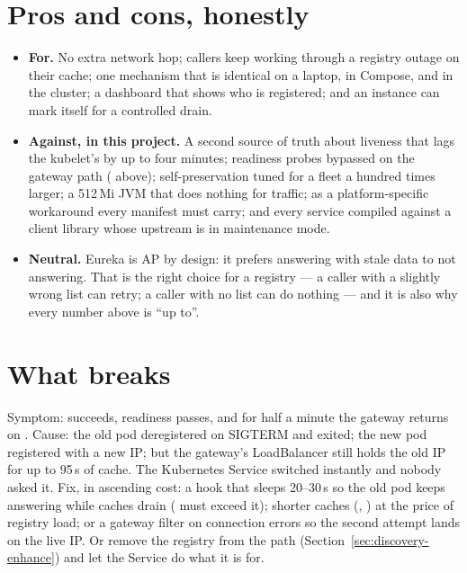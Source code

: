 \section{Pros and cons, honestly}

\begin{itemize}
  \item \textbf{For.} No extra network hop; callers keep working through
  a registry outage on their cache; one mechanism that is identical on a
  laptop, in Compose, and in the cluster; a dashboard that shows who is
  registered; and an instance can mark itself 
  for a controlled drain.
  \item \textbf{Against, in this project.} A second source of truth about
  liveness that lags the kubelet's by up to four minutes; readiness
  probes bypassed on the gateway path ( above); self-preservation
  tuned for a fleet a hundred times larger; a 512\,Mi JVM that does
  nothing for traffic;  as a platform-specific
  workaround every manifest must carry; and every service compiled
  against a client library whose upstream is in maintenance mode.
  \item \textbf{Neutral.} Eureka is AP by design: it prefers answering
  with stale data to not answering. That is the right choice for a
  registry --- a caller with a slightly wrong list can retry; a caller
  with no list can do nothing --- and it is also why every number above
  is ``up to''.
\end{itemize}

\section{What breaks}

\begin{pitfall}
Symptom: 
succeeds, readiness passes, and for half a minute the gateway returns
 on . Cause: the old
pod deregistered on SIGTERM and exited; the new pod registered with a
new IP; but the gateway's LoadBalancer still holds the old IP for up to
95\,s of cache. The Kubernetes Service switched instantly and nobody
asked it. Fix, in ascending cost: a  hook that sleeps
20--30\,s so the old pod keeps answering while caches drain
( must exceed it); shorter caches
(,
) at the price of
registry load; or a gateway  filter on connection errors so
the second attempt lands on the live IP. Or remove the registry from the
path (Section~\ref{sec:discovery-enhance}) and let the Service do what it
is for.
\end{pitfall}

